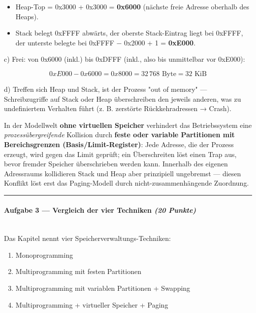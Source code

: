 \documentclass[11pt, a4paper]{article}
\begin{document}
\begin{itemize}
  \item Heap-Top = 0x3000 + 0x3000 = \textbf{0x6000} (nächste freie Adresse oberhalb des Heaps).
  \item Stack belegt 0xFFFF abwärts, der oberste Stack-Eintrag liegt bei 0xFFFF, der unterste belegte bei 0xFFFF − 0x2000 + 1 = \textbf{0xE000}.
\end{itemize}

c) Frei: von 0x6000 (inkl.) bis 0xDFFF (inkl., also bis unmittelbar vor 0xE000):


\[
0xE000 - 0x6000 = 0x8000 = 32\,768 \text{ Byte} = 32 \text{ KiB}
\]


d) Treffen sich Heap und Stack, ist der Prozess "out of memory" — Schreibzugriffe auf Stack oder Heap überschreiben den jeweils anderen, was zu undefiniertem Verhalten führt (z. B. zerstörte Rückkehradressen → Crash).

In der Modellwelt \textbf{ohne virtuellen Speicher} verhindert das Betriebssystem eine \textit{prozessübergreifende} Kollision durch \textbf{feste oder variable Partitionen mit Bereichsgrenzen (Basis/Limit-Register)}: Jede Adresse, die der Prozess erzeugt, wird gegen das Limit geprüft; ein Überschreiten löst einen Trap aus, bevor fremder Speicher überschrieben werden kann. Innerhalb des eigenen Adressraums kollidieren Stack und Heap aber prinzipiell ungebremst — diesen Konflikt löst erst das Paging-Modell durch nicht-zusammenhängende Zuordnung.



\noindent\textcolor{rulegray}{\rule{\linewidth}{0.4pt}}


\paragraph{Aufgabe 3 — Vergleich der vier Techniken \textit{(20 Punkte)}}\mbox{}\\[2pt]

Das Kapitel nennt vier Speicherverwaltungs-Techniken:


\begin{enumerate}
  \item Monoprogramming
  \item Multiprogramming mit festen Partitionen
  \item Multiprogramming mit variablen Partitionen + Swapping
  \item Multiprogramming + virtueller Speicher + Paging
\end{enumerate}
\end{document}

